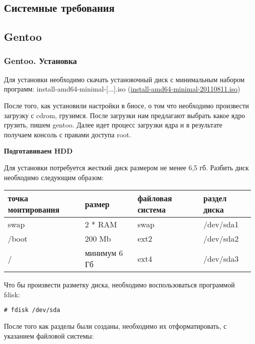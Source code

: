 \documentclass[12pt, a4paper]{article}
\begin{document}
\subsection{Системные требования}
\subsection{Gentoo}

\subsubsection{Gentoo. Установка}

Для установки необходимо скачать установочный диск с минимальным набором программ: 
install-amd64-minimal-[...].iso
(\href{http://mirror.yandex.ru/gentoo-distfiles/releases/amd64/current-iso/install-amd64-minimal-20110811.iso}{install-amd64-minimal-20110811.iso})

После того, как установили настройки в биосе, о том что необходимо произвести загрузку с cdrom, грузимся. После загрузки нам предлагают выбрать какое ядро грузить, пишем gentoo. Далее идет процесс загрузки ядра и в результате получаем консоль с правами доступа root.


{\bf Подготавиваем HDD}


Для установки потребуется жесткий диск размером не менее 6,5 гб. Разбить диск необходимо следующим образом:

\begin{center}
\begin{tabular}{|l|l|l|l|}
\hline точка монтирования  & размер & файловая система & раздел диска \\
\hline swap  & 2 * RAM & swap & /dev/sda1 \\
\hline /boot & 200 Mb & ext2  & /dev/sda2 \\
\hline / & минимум 6 Гб & ext4 & /dev/sda3 \\
\hline
\end{tabular}
\end{center}

Что бы произвести разметку диска, необходимо воспользоваться программой fdisk:

\begin{verbatim}
# fdisk /dev/sda
\end{verbatim}


После того как разделы были созданы, необходимо их отформатировать, с указанием файловой системы:
\end{document}
